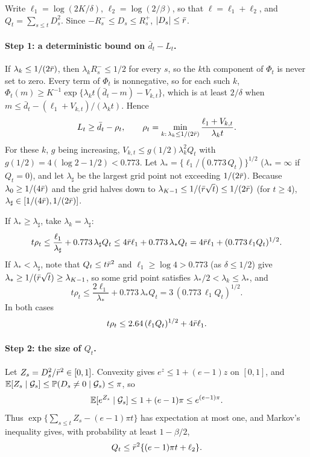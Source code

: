 Write $\ell_1=\log(2K/\delta)$, $\ell_2=\log(2/\beta)$, so that
$\ell=\ell_1+\ell_2$, and $Q_t=\sum_{s\le t}D_s^2$. Since
$-R_s^-\le D_s\le R_s^+$, $|D_s|\le\bar r$.

\paragraph{Step 1: a deterministic bound on $\bar d_t-L_t$.}
If $\lambda_k\le1/(2\bar r)$, then $\lambda_kR_s^-\le1/2$ for every $s$, so
the $k$th component of $\Phi_t$ is never set to zero. Every term of
$\Phi_t$ is nonnegative, so for each such $k$,
$\Phi_t(m)\ge K^{-1}\exp\{\lambda_kt(\bar d_t-m)-V_{k,t}\}$, which is at
least $2/\delta$ when $m\le\bar d_t-(\ell_1+V_{k,t})/(\lambda_kt)$. Hence
\[
 L_t\ge\bar d_t-\rho_t,\qquad
 \rho_t=\min_{k:\,\lambda_k\le1/(2\bar r)}\frac{\ell_1+V_{k,t}}{\lambda_kt}.
\]
For these $k$, $g$ being increasing, $V_{k,t}\le g(1/2)\lambda_k^2Q_t$ with
$g(1/2)=4(\log2-1/2)<0.773$. Let $\lambda_*=\{\ell_1/(0.773\,Q_t)\}^{1/2}$
($\lambda_*=\infty$ if $Q_t=0$), and let $\lambda_\sharp$ be the largest
grid point not exceeding $1/(2\bar r)$. Because $\lambda_0\ge1/(4\bar r)$ and
the grid halves down to $\lambda_{K-1}\le1/(\bar r\sqrt t)\le1/(2\bar r)$ (for
$t\ge4$), $\lambda_\sharp\in[1/(4\bar r),1/(2\bar r)]$.

If $\lambda_*\ge\lambda_\sharp$, take $\lambda_k=\lambda_\sharp$:
\[
 t\rho_t\le\frac{\ell_1}{\lambda_\sharp}+0.773\,\lambda_\sharp Q_t
 \le4\bar r\ell_1+0.773\,\lambda_*Q_t
 =4\bar r\ell_1+(0.773\,\ell_1Q_t)^{1/2}.
\]
If $\lambda_*<\lambda_\sharp$, note that $Q_t\le t\bar r^2$ and
$\ell_1\ge\log4>0.773$ (as $\delta\le1/2$) give
$\lambda_*\ge1/(\bar r\sqrt t)\ge\lambda_{K-1}$, so some grid point
satisfies $\lambda_*/2<\lambda_k\le\lambda_*$, and
\[
 t\rho_t\le\frac{2\ell_1}{\lambda_*}+0.773\,\lambda_*Q_t
 =3\,(0.773\,\ell_1Q_t)^{1/2}.
\]
In both cases
\begin{equation}
 t\rho_t\le2.64\,(\ell_1Q_t)^{1/2}+4\bar r\ell_1 .
 \label{eq:rho}
\end{equation}

\paragraph{Step 2: the size of $Q_t$.}
Let $Z_s=D_s^2/\bar r^2\in[0,1]$. Convexity gives $e^z\le1+(e-1)z$ on
$[0,1]$, and $\mathbb{E}[Z_s\mid\mathcal{G}_s]\le\mathbb{P}(D_s\ne0\mid\mathcal{G}_s)\le\pi$, so
\[
 \mathbb{E}[e^{Z_s}\mid\mathcal{G}_s]\le1+(e-1)\pi\le e^{(e-1)\pi}.
\]
Thus $\exp\{\sum_{s\le t}Z_s-(e-1)\pi t\}$ has expectation at most one, and
Markov's inequality gives, with probability at least $1-\beta/2$,
\begin{equation}
 Q_t\le\bar r^2\{(e-1)\pi t+\ell_2\}.
 \label{eq:Q}
\end{equation}

